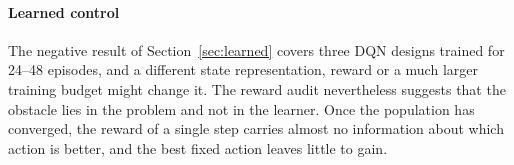 \paragraph{Learned control}
The negative result of Section~\ref{sec:learned} covers three DQN designs trained for 24--48 episodes, and a different
state representation, reward or a much larger training budget might change it. The reward audit nevertheless suggests
that the obstacle lies in the problem and not in the learner. Once the population has converged, the reward of a single
step carries almost no information about which action is better, and the best fixed action leaves little to gain.
